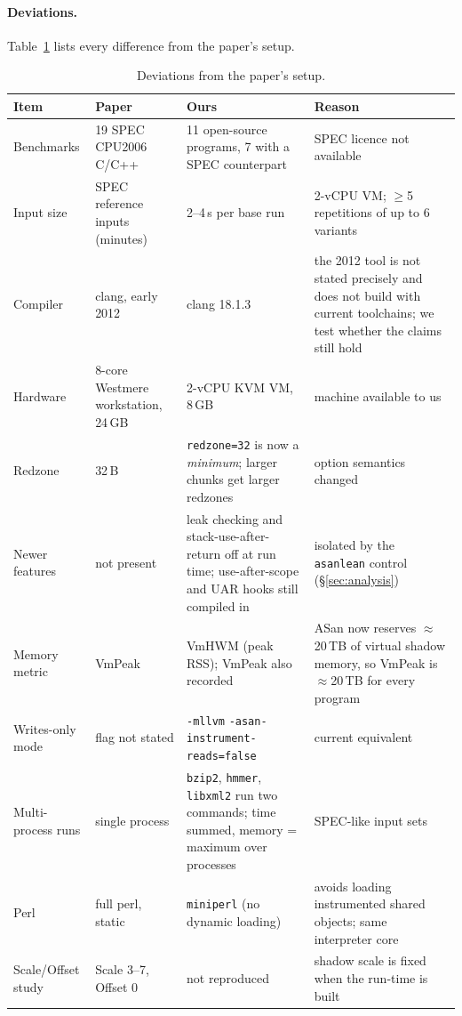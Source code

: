 \documentclass[10pt,a4paper]{article}
\newcommand{\asan}{ASan}
\newcommand{\cmd}[1]{\texttt{#1}}
\begin{document}
\paragraph{Deviations.}
Table~\ref{tab:dev} lists every difference from the paper's setup.

\begin{table}[t]
\centering\small
\caption{Deviations from the paper's setup.}\label{tab:dev}
\begin{tabularx}{\linewidth}{lXXX}
\toprule
Item & Paper & Ours & Reason \\
\midrule
Benchmarks & 19 SPEC CPU2006 C/C++ & 11 open-source programs, 7 with a SPEC counterpart & SPEC licence not available \\
Input size & SPEC reference inputs (minutes) & 2--4\,s per base run & 2-vCPU VM; $\geq$5 repetitions of up to 6 variants \\
Compiler & clang, early 2012 & clang 18.1.3 & the 2012 tool is not stated precisely and does not build with current toolchains; we test whether the claims still hold \\
Hardware & 8-core Westmere workstation, 24\,GB & 2-vCPU KVM VM, 8\,GB & machine available to us \\
Redzone & 32\,B & \cmd{redzone=32} is now a \emph{minimum}; larger chunks get larger redzones & option semantics changed \\
Newer features & not present & leak checking and stack-use-after-return off at run time; use-after-scope and UAR hooks still compiled in & isolated by the \cmd{asanlean} control (\S\ref{sec:analysis}) \\
Memory metric & VmPeak & VmHWM (peak RSS); VmPeak also recorded & \asan{} now reserves $\approx$20\,TB of virtual shadow memory, so VmPeak is $\approx$20\,TB for every program \\
Writes-only mode & flag not stated & \cmd{-mllvm} \cmd{-asan-instrument-\allowbreak{}reads=false} & current equivalent \\
Multi-process runs & single process & \cmd{bzip2}, \cmd{hmmer}, \cmd{libxml2} run two commands; time summed, memory = maximum over processes & SPEC-like input sets \\
Perl & full perl, static & \cmd{miniperl} (no dynamic loading) & avoids loading instrumented shared objects; same interpreter core \\
Scale/Offset study & Scale 3--7, Offset 0 & not reproduced & shadow scale is fixed when the run-time is built \\
\bottomrule
\end{tabularx}
\end{table}
\end{document}
